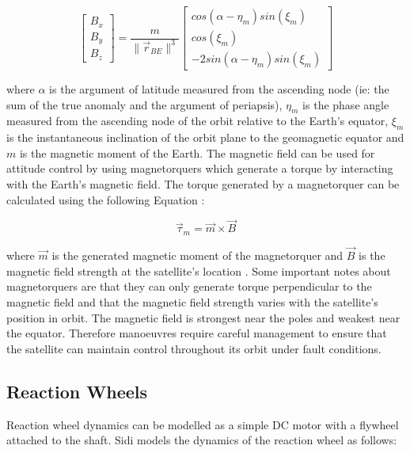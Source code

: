 \begin{equation}
    \begin{bmatrix}
        B_{x} \\
        B_{y} \\
        B_{z}
    \end{bmatrix} = \frac{m}{\|\vec{r}_{BE}\|^3} \begin{bmatrix}
        cos(\alpha - \eta_m)sin(\xi_m) \\
        cos(\xi_m) \\
        -2sin(\alpha - \eta_m)sin(\xi_m)
    \end{bmatrix}
\end{equation}

where $\alpha$ is the argument of latitude measured from the ascending node (ie: the sum of the true anomaly and the argument of periapsis), $\eta_m$ is the phase angle measured from the ascending node of the orbit relative to the Earth's equator, $\xi_m$ is the instantaneous inclination of the orbit plane to the geomagnetic equator and $m$ is the magnetic moment of the Earth. \cite{sidiAttitudeDynamicsKinematics1997} The magnetic field can be used for attitude control by using magnetorquers which generate a torque by interacting with the Earth's magnetic field. The torque generated by a magnetorquer can be calculated using the following Equation \cite{sidiAttitudeDynamicsKinematics1997}:

\begin{equation}
    \vec{\tau}_m = \vec{m} \times \vec{B}
    \label{eq:magt_torque}
\end{equation}

where $\vec{m}$ is the generated magnetic moment of the magnetorquer and $\vec{B}$ is the magnetic field strength at the satellite's location \cite{sidiAttitudeDynamicsKinematics1997}. Some important notes about magnetorquers are that they can only generate torque perpendicular to the magnetic field and that the magnetic field strength varies with the satellite's position in orbit. The magnetic field is strongest near the poles and weakest near the equator.  Therefore manoeuvres require careful management to ensure that the satellite can maintain control throughout its orbit under fault conditions.

\subsection{Reaction Wheels}
Reaction wheel dynamics can be modelled as a simple DC motor with a flywheel attached to the shaft. Sidi \cite{sidiAttitudeDynamicsKinematics1997} models the dynamics of the reaction wheel as follows:

